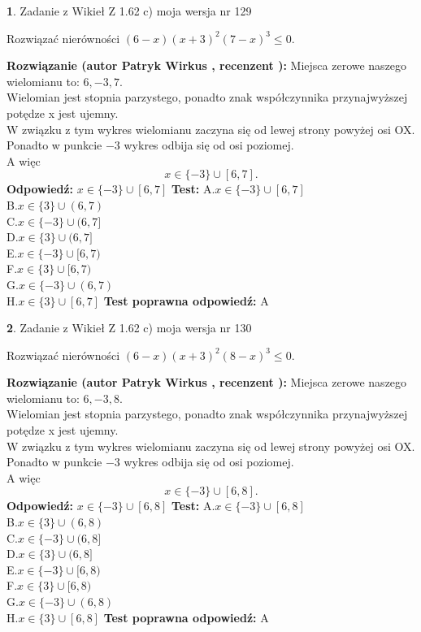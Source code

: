 \documentclass[12pt, a4paper]{article}
\theoremstyle{definition} %
\newtheorem{zad}{}
\newcommand{\zadStart}[1]{\begin{zad}#1\newline}
\newcommand{\zadStop}{\end{zad}}
\newcommand{\rozwStart}[2]{\noindent \textbf{Rozwiązanie (autor #1 , recenzent #2): }\newline}
\newcommand{\rozwStop}{\newline}
\newcommand{\odpStart}{\noindent \textbf{Odpowiedź:}\newline}
\newcommand{\odpStop}{\newline}
\newcommand{\testStart}{\noindent \textbf{Test:}\newline}
\newcommand{\testStop}{\newline}
\newcommand{\kluczStart}{\noindent \textbf{Test poprawna odpowiedź:}\newline}
\newcommand{\kluczStop}{\newline}
\begin{document}
\zadStart{Zadanie z Wikieł Z 1.62 c) moja wersja nr 129}

Rozwiązać nierówności $(6-x)(x+3)^{2}(7-x)^{3}\le0$.
\zadStop
\rozwStart{Patryk Wirkus}{}
Miejsca zerowe naszego wielomianu to: $6, -3, 7$.\\
Wielomian jest stopnia parzystego, ponadto znak współczynnika przy\linebreak najwyższej potędze x jest ujemny.\\ W związku z tym wykres wielomianu zaczyna się od lewej strony powyżej osi OX.\\
Ponadto w punkcie $-3$ wykres odbija się od osi poziomej.\\
A więc $$x \in \{-3\} \cup [6,7].$$
\rozwStop
\odpStart
$x \in \{-3\} \cup [6,7]$
\odpStop
\testStart
A.$x \in \{-3\} \cup [6,7]$\\
B.$x \in \{3\} \cup (6,7)$\\
C.$x \in \{-3\} \cup (6,7]$\\
D.$x \in \{3\} \cup (6,7]$\\
E.$x \in \{-3\} \cup [6,7)$\\
F.$x \in \{3\} \cup [6,7)$\\
G.$x \in \{-3\} \cup (6,7)$\\
H.$x \in \{3\} \cup [6,7]$
\testStop
\kluczStart
A
\kluczStop



\zadStart{Zadanie z Wikieł Z 1.62 c) moja wersja nr 130}

Rozwiązać nierówności $(6-x)(x+3)^{2}(8-x)^{3}\le0$.
\zadStop
\rozwStart{Patryk Wirkus}{}
Miejsca zerowe naszego wielomianu to: $6, -3, 8$.\\
Wielomian jest stopnia parzystego, ponadto znak współczynnika przy\linebreak najwyższej potędze x jest ujemny.\\ W związku z tym wykres wielomianu zaczyna się od lewej strony powyżej osi OX.\\
Ponadto w punkcie $-3$ wykres odbija się od osi poziomej.\\
A więc $$x \in \{-3\} \cup [6,8].$$
\rozwStop
\odpStart
$x \in \{-3\} \cup [6,8]$
\odpStop
\testStart
A.$x \in \{-3\} \cup [6,8]$\\
B.$x \in \{3\} \cup (6,8)$\\
C.$x \in \{-3\} \cup (6,8]$\\
D.$x \in \{3\} \cup (6,8]$\\
E.$x \in \{-3\} \cup [6,8)$\\
F.$x \in \{3\} \cup [6,8)$\\
G.$x \in \{-3\} \cup (6,8)$\\
H.$x \in \{3\} \cup [6,8]$
\testStop
\kluczStart
A
\kluczStop
\end{document}
